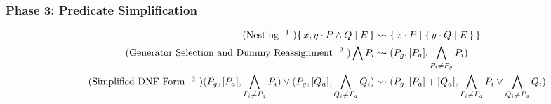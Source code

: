 \documentclass{article}
\newcommand{\bSet}[3]{%
  \{\, #1 \cdot #2 \mid #3 \, \}%
}
\begin{document}
\subsubsection{Phase 3: Predicate Simplification}

\noindent\begin{minipage}{\linewidth}
\begin{align}
  \tag{Nesting \footnote{$y$ cannot occur in $P$}}
  \bSet{x,y}{P \land Q}{E}
  &\leadsto
  \bSet{x}{P}{\bSet{y}{Q}{E}}
  \\
  \tag{Generator Selection and Dummy Reassignment \footnote{The LH term must occur inside a quantifier's predicate - one match per or-clause. $P_g$ is the generator, a single clause distinguished from the rest of $\bigwedge P_i$.\\
  Dummy Reassignment uses assignment to calculate expressions outside of the if-statement. For example, $\bSet{x}{x \in S \land z = f(x)}{z}$ indirectly binds $z$ (if $z$ is free), although $z$ does not appear in the quantifier list. This may be less efficient for simple cases than directly rewriting all occurrences of z to f(x), but additional conditions that make use of z would benefit from the intermediate calculation. $P_a$ is an ordered list of such assignments (drawn from $\bigwedge P_i$), so that additional layers of indirection may be accommodated. The expectation is that LLVM will filter out superfluous assignments, though we will test this assumption later.\\Right now, we just make a naive selection of generator (ie., the first viable option). Later, this will be more intelligent.}}
  \bigwedge P_i
  &\leadsto
  (P_g, [P_a], \bigwedge_{P_i \neq P_g} P_i)
  \\
  \tag{Simplified DNF Form \footnote{The LH term must occur inside a quantifier's predicate. Combines clauses with the same generator. Requires Generator Selection to be run first}}
  (P_{g}, [P_a], \bigwedge_{P_i \neq P_g} P_i) \lor (P_{g}, [Q_a], \bigwedge_{Q_i \neq P_g} Q_i)
  &\leadsto
  (P_g, [P_a] + [Q_a],\bigwedge_{P_i \neq P_g} P_i \lor \bigwedge_{Q_i \neq P_g} Q_i)
\end{align}
\end{minipage}
\end{document}
